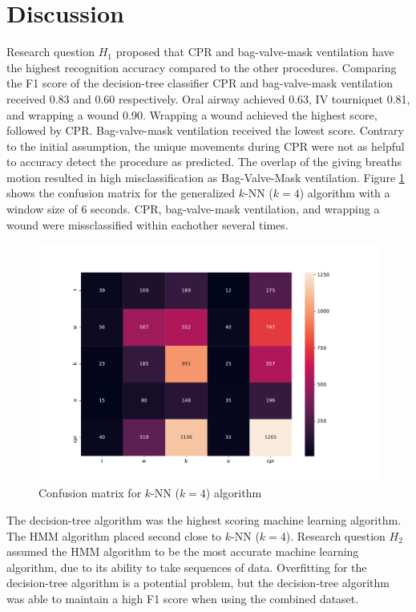 \section{Discussion}
\label{sec:Results:Discussion}
Research question $H_1$ proposed that CPR and bag-valve-mask ventilation have the highest recognition accuracy compared to the other procedures. Comparing the F1 score of the decision-tree classifier CPR and bag-valve-mask ventilation received 0.83 and 0.60 respectively. Oral airway achieved 0.63, IV tourniquet 0.81, and wrapping a wound 0.90. Wrapping a wound achieved the highest score, followed by CPR. Bag-valve-mask ventilation received the lowest score. Contrary to the initial assumption, the unique movements during CPR were not as helpful to accuracy detect the procedure as predicted. The overlap of the giving breaths motion resulted in high misclassification as Bag-Valve-Mask ventilation. Figure \ref{fig:knn46s} shows the confusion matrix for the generalized $k$-NN ($k=4$) algorithm with a window size of 6 seconds. CPR, bag-valve-mask ventilation, and wrapping a wound were missclassified within eachother several times.
\begin{figure}
	\centering
	\includegraphics[width=0.7\linewidth]{pictures/knn4_6s}
	\caption{Confusion matrix for $k$-NN ($k=4$) algorithm}
	\label{fig:knn46s}
\end{figure}
\par The decision-tree algorithm was the highest scoring machine learning algorithm. The HMM algorithm placed second close to $k$-NN ($k=4$). Research question $H_2$ assumed the HMM algorithm to be the most accurate machine learning algorithm, due to its ability to take sequences of data. Overfitting for the decision-tree algorithm is a potential problem, but the decision-tree algorithm was able to maintain a high F1 score when using the combined dataset.

